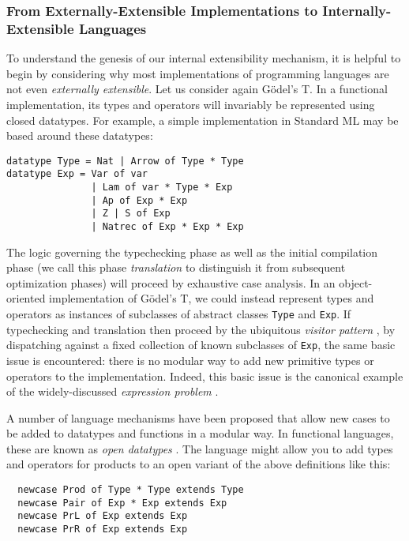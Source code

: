 
\subsubsection{From Externally-Extensible Implementations to Internally-Extensible Languages}
To understand the genesis of our internal extensibility mechanism, it is helpful to begin by considering why most implementations of programming languages are not even \emph{externally extensible}. Let us consider again G\"odel's T. 
In a functional implementation, its types and operators will invariably be represented using {closed} datatypes. For example, a simple implementation in Standard ML may be based around these datatypes:
\begin{lstlisting}
datatype Type = Nat | Arrow of Type * Type
datatype Exp = Var of var 
               | Lam of var * Type * Exp
               | Ap of Exp * Exp 
               | Z | S of Exp 
               | Natrec of Exp * Exp * Exp
\end{lstlisting}

The logic governing the typechecking phase as well as the initial compilation phase (we call this phase \emph{translation} to distinguish it from subsequent optimization phases) will proceed by exhaustive case analysis.
In an object-oriented implementation of G\"odel's T, we could instead represent types and operators as instances of subclasses of abstract classes \lstinline{Type} and \lstinline{Exp}. If typechecking and translation then proceed by the ubiquitous \emph{visitor pattern} \cite{visitor}, by dispatching against a {fixed} collection of known subclasses of \lstinline{Exp}, the same basic issue is encountered: there is no modular way to add new primitive types or operators to the implementation.
Indeed, this basic issue is the canonical example of the widely-discussed \emph{expression problem} \cite{wadler-expression}.

A number of language mechanisms have been proposed that allow new cases to be added to datatypes and functions  in a modular way. In functional languages, these are known as \emph{open datatypes} \cite{open-datatypes}. The language might allow you to add types and operators for products to an open variant of the above definitions  like this: 
\begin{lstlisting}
  newcase Prod of Type * Type extends Type
  newcase Pair of Exp * Exp extends Exp
  newcase PrL of Exp extends Exp
  newcase PrR of Exp extends Exp
\end{lstlisting}

